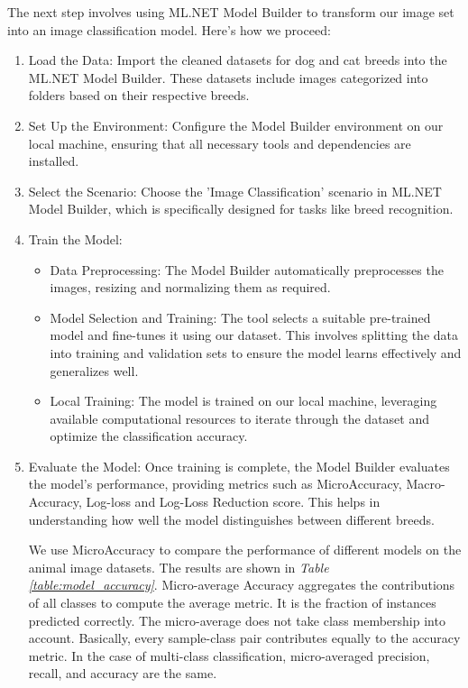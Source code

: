 The next step involves using ML.NET Model Builder to transform our image set into an image classification model. Here's how we proceed:
\begin{enumerate}
    \item Load the Data: Import the cleaned datasets for dog and cat breeds into the ML.NET Model Builder. These datasets include images
          categorized into folders based on their respective breeds.
    \item Set Up the Environment: Configure the Model Builder environment on our local machine, ensuring that all necessary tools and dependencies are installed.
    \item Select the Scenario: Choose the 'Image Classification' scenario in ML.NET Model Builder, which is specifically designed for tasks like breed recognition.
    \item Train the Model:
          \begin{itemize}
              \item Data Preprocessing: The Model Builder automatically preprocesses the images, resizing and normalizing them as required.
              \item Model Selection and Training: The tool selects a suitable pre-trained model and fine-tunes it using our dataset. This involves
                    splitting the data into training and validation sets to ensure the model learns effectively and generalizes well.
              \item Local Training: The model is trained on our local machine, leveraging available computational resources to iterate through
                    the dataset and optimize the classification accuracy.
          \end{itemize}
    \item Evaluate the Model: Once training is complete, the Model Builder evaluates the model's performance,
          providing metrics such as MicroAccuracy, Macro-Accuracy, Log-loss and Log-Loss Reduction score. This helps in understanding how well
          the model distinguishes between different breeds.

          We use MicroAccuracy to compare the performance of different models on the animal image datasets. The results are shown in \emph{Table \ref{table:model_accuracy}}.
          Micro-average Accuracy aggregates the contributions of all classes to compute the average metric. It is the fraction of instances predicted correctly. 
          The micro-average does not take class membership into account. Basically, every sample-class pair contributes equally to the accuracy metric. In the case of multi-class classification, micro-averaged precision, recall, and accuracy are the same. 




\end{enumerate}
